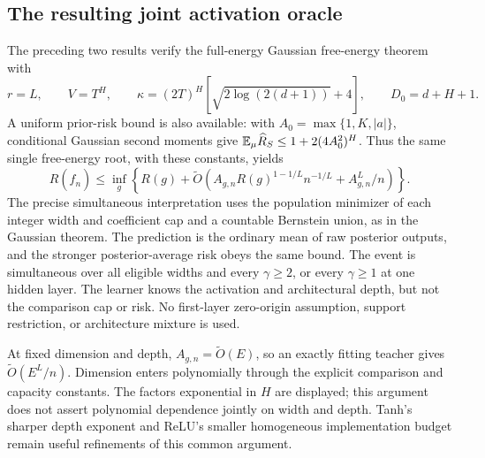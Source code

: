 \subsection{The resulting joint activation oracle}
The preceding two results verify the full-energy Gaussian free-energy theorem with
\[
 r=L,\qquad V=T^H,\qquad
 \kappa=(2T)^H\left[\sqrt{2\log(2(d+1))}+4\right],
 \qquad D_0=d+H+1.
\]
A uniform prior-risk bound is also available: with $A_0=\max\{1,K,|a|\}$, conditional Gaussian second moments give
$\mathbb E_\mu\widehat R_S\le1+2(4A_0^2)^H$.
Thus the same single free-energy root, with these constants, yields
\begin{equation}
 R(\widehat f_n)\le\inf_g\left\{R(g)+\widetilde O\left(
 A_{g,n}R(g)^{1-1/L}n^{-1/L}+A_{g,n}^L/n\right)\right\}.
 \label{eq:bv-oracle}
\end{equation}
The precise simultaneous interpretation uses the population minimizer of each integer width and coefficient cap and a countable Bernstein union, as in the Gaussian theorem. The prediction is the ordinary mean of raw posterior outputs, and the stronger posterior-average risk obeys the same bound. The event is simultaneous over all eligible widths and every $\gamma\ge2$, or every $\gamma\ge1$ at one hidden layer. The learner knows the activation and architectural depth, but not the comparison cap or risk. No first-layer zero-origin assumption, support restriction, or architecture mixture is used.

At fixed dimension and depth, $A_{g,n}=\widetilde O(E)$, so an exactly fitting teacher gives $\widetilde O(E^L/n)$. Dimension enters polynomially through the explicit comparison and capacity constants. The factors exponential in $H$ are displayed; this argument does not assert polynomial dependence jointly on width and depth. Tanh's sharper depth exponent and ReLU's smaller homogeneous implementation budget remain useful refinements of this common argument.
